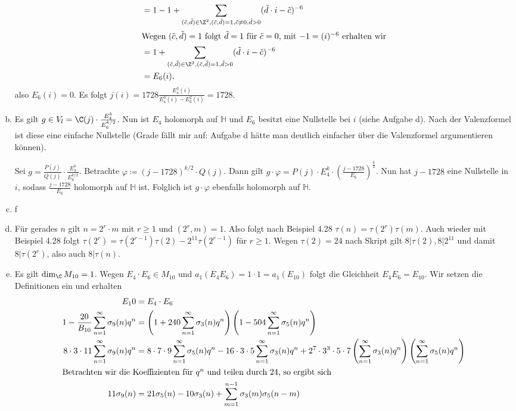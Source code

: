 \documentclass{article}
\begin{document}
\begin{enumerate}[(a)]
\begin{align*}
        &= 1 - 1 + \sum_{(\tilde c, \tilde d) \in \Z^2, (\tilde c,\tilde d) = 1, \tilde c \neq 0, \tilde d > 0}(\tilde d\cdot i - \tilde c)^{-6}\\
        \intertext{Wegen $(\tilde c, \tilde d) = 1$ folgt $\tilde d = 1$ für $\tilde c = 0$, mit $-1 = (i)^{-6}$ erhalten wir}
        &= 1 + \sum_{(\tilde c, \tilde d) \in \Z^2, (\tilde c,\tilde d) = 1, \tilde d > 0}(\tilde d\cdot i - \tilde c)^{-6}\\
        &= E_6(i),
    \end{align*}
    also $E_6(i) = 0$.
    Es folgt $j(i) = 1728 \frac{E_4^3(i)}{E_4^3(i) - E_6^2(i)} = 1728$. 
    \item Es gilt $g\in V_l = \C(j) \cdot \frac{E_4^k}{E_6^{k/2}}$. Nun ist $E_4$ holomorph auf $\mathbb H$ und $E_6$ besitzt eine Nullstelle bei $i$ (siehe Aufgabe d). Nach der Valenzformel ist diese eine einfache Nullstelle (Grade fällt mir auf: Aufgabe d hätte man deutlich einfacher über die Valenzformel argumentieren können).
    
    Sei $g = \frac{P(j)}{Q(j)} \cdot \frac{E_4^k}{E_6^{k/2}}$.
    Betrachte $\varphi \coloneqq (j - 1728)^{k/2} \cdot Q(j)$. Dann gilt $g \cdot \varphi = P(j) \cdot E_4^k \cdot \left(\frac{j-1728}{E_6}\right)^\frac{k}{2}$. Nun hat $j - 1728$ eine Nullstelle in $i$, sodass $\frac{j-1728}{E_6}$ holomorph auf $\mathbb H$ ist. Folglich ist $g\cdot \varphi$ ebenfalls holomorph auf $\mathbb H$.
    \item f
    \item Für gerades $n$ gilt $n = 2^r \cdot m$ mit $r \geq 1$ und $(2^r, m) = 1$. Also folgt nach Beispiel 4.28 $\tau(n) = \tau(2^r)\tau(m)$. Auch wieder mit Beispiel 4.28 folgt $\tau(2^r) = \tau(2^{r-1})\tau(2) - 2^11\tau(2^{r-1})$ für $r\geq 1$.
    Wegen $\tau(2) = 24$ nach Skript gilt $8 | \tau(2), 8|2^11$ und damit $8 | \tau(2^r)$, also auch $8|\tau(n)$.
    \item Es gilt $\dim_\C M_{10} = 1$. Wegen $E_4 \cdot E_6 \in M_{10}$ und $a_1(E_4E_6) = 1 \cdot 1 = a_1(E_{10})$ folgt die Gleichheit $E_4E_6 = E_{10}$.
    Wir setzen die Definitionen ein und erhalten
    \begin{align*}
        E_10 &= E_4 \cdot E_6\\
        1 - \frac{20}{B_{10}}\sum_{n = 1}^{\infty} \sigma_9(n)q^n &= \left(1 + 240 \sum_{n = 1}^{\infty} \sigma_3(n)q^n\right)\left(1 - 504\sum_{n = 1}^{\infty} \sigma_5(n)q^n\right)\\
        8 \cdot 3 \cdot 11 \sum_{n = 1}^{\infty} \sigma_9(n) q^n &= 8 \cdot 7 \cdot 9 \sum_{n = 1}^{\infty} \sigma_5(n)q^n -16\cdot 3\cdot 5 \sum_{n = 1}^{\infty} \sigma_3(n)q^n + 2^7 \cdot 3^3 \cdot 5 \cdot 7\left(\sum_{n = 1}^{\infty} \sigma_3(n)q^n\right)\left(\sum_{n = 1}^{\infty} \sigma_5(n)q^n\right)\\
        \intertext{Betrachten wir die Koeffizienten für $q^n$ und teilen durch 24, so ergibt sich}
        11 \sigma_9(n) &= 21\sigma_5(n) - 10\sigma_3(n) + \sum_{m = 1}^{n-1} \sigma_3(m)\sigma_5(n-m)
    \end{align*}
\end{enumerate}
\end{document}
